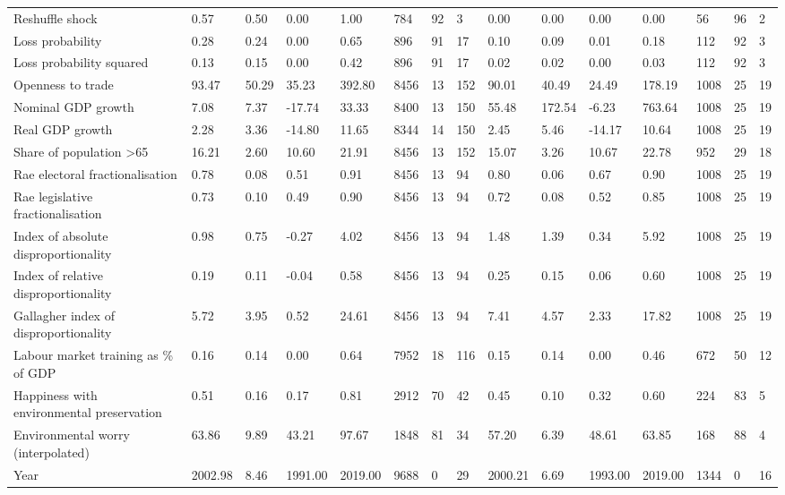 \begin{longtable}{lllllllllllllll}
Reshuffle shock & 0.57 & 0.50 & 0.00 & 1.00 & 784 & 92 & 3 & 0.00 & 0.00 & 0.00 & 0.00 & 56 & 96 & 2\\
Loss probability & 0.28 & 0.24 & 0.00 & 0.65 & 896 & 91 & 17 & 0.10 & 0.09 & 0.01 & 0.18 & 112 & 92 & 3\\
\addlinespace
Loss probability squared & 0.13 & 0.15 & 0.00 & 0.42 & 896 & 91 & 17 & 0.02 & 0.02 & 0.00 & 0.03 & 112 & 92 & 3\\
Openness to trade & 93.47 & 50.29 & 35.23 & 392.80 & 8456 & 13 & 152 & 90.01 & 40.49 & 24.49 & 178.19 & 1008 & 25 & 19\\
Nominal GDP growth & 7.08 & 7.37 & -17.74 & 33.33 & 8400 & 13 & 150 & 55.48 & 172.54 & -6.23 & 763.64 & 1008 & 25 & 19\\
Real GDP growth & 2.28 & 3.36 & -14.80 & 11.65 & 8344 & 14 & 150 & 2.45 & 5.46 & -14.17 & 10.64 & 1008 & 25 & 19\\
Share of population >65 & 16.21 & 2.60 & 10.60 & 21.91 & 8456 & 13 & 152 & 15.07 & 3.26 & 10.67 & 22.78 & 952 & 29 & 18\\
\addlinespace
Rae electoral fractionalisation & 0.78 & 0.08 & 0.51 & 0.91 & 8456 & 13 & 94 & 0.80 & 0.06 & 0.67 & 0.90 & 1008 & 25 & 19\\
Rae legislative fractionalisation & 0.73 & 0.10 & 0.49 & 0.90 & 8456 & 13 & 94 & 0.72 & 0.08 & 0.52 & 0.85 & 1008 & 25 & 19\\
Index of absolute disproportionality & 0.98 & 0.75 & -0.27 & 4.02 & 8456 & 13 & 94 & 1.48 & 1.39 & 0.34 & 5.92 & 1008 & 25 & 19\\
Index of relative disproportionality & 0.19 & 0.11 & -0.04 & 0.58 & 8456 & 13 & 94 & 0.25 & 0.15 & 0.06 & 0.60 & 1008 & 25 & 19\\
Gallagher index of disproportionality & 5.72 & 3.95 & 0.52 & 24.61 & 8456 & 13 & 94 & 7.41 & 4.57 & 2.33 & 17.82 & 1008 & 25 & 19\\
\addlinespace
Labour market training as \% of GDP & 0.16 & 0.14 & 0.00 & 0.64 & 7952 & 18 & 116 & 0.15 & 0.14 & 0.00 & 0.46 & 672 & 50 & 12\\
Happiness with environmental preservation & 0.51 & 0.16 & 0.17 & 0.81 & 2912 & 70 & 42 & 0.45 & 0.10 & 0.32 & 0.60 & 224 & 83 & 5\\
Environmental worry (interpolated) & 63.86 & 9.89 & 43.21 & 97.67 & 1848 & 81 & 34 & 57.20 & 6.39 & 48.61 & 63.85 & 168 & 88 & 4\\
Year & 2002.98 & 8.46 & 1991.00 & 2019.00 & 9688 & 0 & 29 & 2000.21 & 6.69 & 1993.00 & 2019.00 & 1344 & 0 & 16\\
\bottomrule
\end{longtable}
